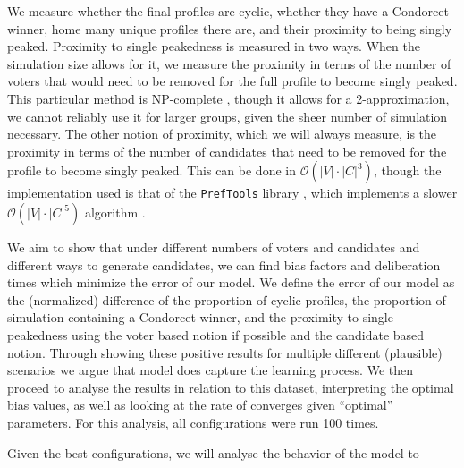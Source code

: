 We measure whether the final profiles are cyclic, whether they have a Condorcet
winner, home many unique profiles there are, and their proximity to being
singly peaked. Proximity to single peakedness is measured in two ways. When the
simulation size allows for it, we measure the proximity in terms of the number
of voters that would need to be removed for the full profile to become singly
peaked. This particular method is NP-complete
\cite{erdelyiComputationalAspectsNearly2013}, though it allows for a
2-approximation, we cannot reliably use it for larger groups, given the sheer
number of simulation necessary. The other notion of proximity, which we will
always measure, is the proximity in terms of the number of candidates that need
to be removed for the profile to become singly peaked. This can be done in
$\mathcal{O}(|V| \cdot{} |C| ^3)$\cite{przedmojskiAlgorithmsExperimentsNearly},
though the implementation used is that of the \texttt{PrefTools} library
\cite{preftool}, which implements a slower $\mathcal{O}(|V| \cdot{} |C|^5)$
algorithm \cite{erdelyiComputationalAspectsNearly2013}. 




We aim to show that under different numbers of voters and candidates and
different ways to generate candidates, we can find bias factors and
deliberation times which minimize the error of our model. We define the error
of our model as the (normalized) difference of the proportion of cyclic
profiles, the proportion of simulation containing a Condorcet winner, and the
proximity to single-peakedness using the voter based notion if possible and the
candidate based notion. Through showing these positive results for multiple
different (plausible) scenarios we argue that model does capture the learning
process. We then proceed to analyse the results in relation to this dataset,
interpreting the optimal bias values, as well as looking at the rate of
converges given ``optimal'' parameters. For this analysis, all configurations
were run 100 times.

Given the best configurations, we will analyse the behavior of the model to 


